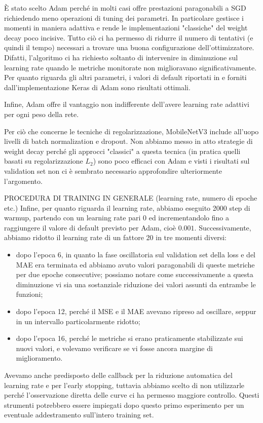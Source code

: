 È stato scelto Adam \cite{adam} perché in molti casi offre prestazioni paragonabili a SGD richiedendo meno operazioni di tuning dei parametri. In particolare gestisce i momenti in maniera adattiva e rende le implementazioni "classiche" del weight decay poco incisive. Tutto ciò ci ha permesso di ridurre il numero di tentativi (e quindi il tempo) necessari a trovare una buona configurazione dell'ottimizzatore. Difatti, l'algoritmo ci ha richiesto soltanto di intervenire in diminuzione sul learning rate quando le metriche monitorate non miglioravano significativamente. 
Per quanto riguarda gli altri parametri, i valori di default riportati in \cite{adam} e forniti dall'implementazione Keras di Adam sono risultati ottimali.

Infine, Adam offre il vantaggio non indifferente dell'avere learning rate adattivi per ogni peso della rete.

Per ciò che concerne le tecniche di regolarizzazione, MobileNetV3 include all'uopo livelli di batch normalization e dropout. Non abbiamo messo in atto strategie di weight decay perché gli approcci "classici" a questa tecnica (in pratica quelli basati su regolarizzazione $L_2$) sono poco efficaci con Adam \cite{adam_no_wd} e visti i risultati sul validation set non ci è sembrato necessario approfondire ulteriormente l'argomento. 

PROCEDURA DI TRAINING IN GENERALE (learning rate, numero di epoche etc.)
Infine, per quanto riguarda il learning rate, abbiamo eseguito 2000\cite{adam_warmup} step di warmup, partendo con un learning rate pari 0 ed incrementandolo fino a raggiungere il valore di default previsto per Adam, cioè $0.001$. Successivamente, abbiamo ridotto il learning rate di un fattore 20 in tre momenti diversi:
\begin{itemize}
	\item dopo l'epoca 6, in quanto la fase oscillatoria sul validation set della loss e del MAE era terminata ed abbiamo avuto valori paragonabili di queste metriche per due epoche consecutive; possiamo notare come successivamente a questa diminuzione vi sia una sostanziale riduzione dei valori assunti da entrambe le funzioni;
	\item dopo l'epoca 12, perché il MSE e il MAE avevano ripreso ad oscillare, seppur in un intervallo particolarmente ridotto;
	\item dopo l'epoca 16, perché le metriche si erano praticamente stabilizzate sui nuovi valori, e volevamo verificare se vi fosse ancora margine di miglioramento.
\end{itemize}
Avevamo anche predisposto delle callback per la riduzione automatica del learning rate e per l'early stopping, tuttavia abbiamo scelto di non utilizzarle perché l'osservazione diretta delle curve ci ha permesso maggiore controllo. Questi strumenti potrebbero essere impiegati dopo questo primo esperimento per un eventuale addestramento sull'intero training set.

